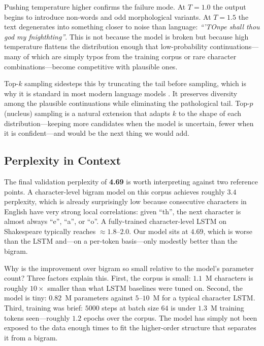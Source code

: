 \noindent Pushing temperature higher confirms the failure mode. At $T = 1.0$ the
output begins to introduce non-words and odd morphological variants. At
$T = 1.5$ the text degenerates into something closer to noise than
language: \emph{``'TOnpe shall thou god my fnighthting''}. This is not
because the model is broken but because high temperature flattens the
distribution enough that low-probability continuations---many of which
are simply typos from the training corpus or rare character
combinations---become competitive with plausible ones.

\noindent Top-$k$ sampling sidesteps this by truncating the tail before sampling,
which is why it is standard in most modern language models
\parencite{holtzman2020curious}. It preserves diversity among the
plausible continuations while eliminating the pathological tail. Top-$p$
(nucleus) sampling is a natural extension that adapts $k$ to the shape of
each distribution---keeping more candidates when the model is uncertain,
fewer when it is confident---and would be the next thing we would add.

\subsection{Perplexity in Context}
\label{sec:perplexity}
The final validation perplexity of \textbf{4.69} is worth interpreting
against two reference points. A character-level bigram model on this
corpus achieves roughly $3.4$ perplexity, which is already surprisingly
low because consecutive characters in English have very strong local
correlations: given ``th'', the next character is almost always ``e'',
``a'', or ``o''. A fully-trained character-level LSTM on Shakespeare
typically reaches $\approx 1.8$--$2.0$. Our model sits at $4.69$,
which is worse than the LSTM and---on a per-token basis---only modestly
better than the bigram.

\noindent Why is the improvement over bigram so small relative to the model's
parameter count? Three factors explain this. First, the corpus is
small: $1.1$~M characters is roughly $10\times$ smaller than what LSTM
baselines were tuned on. Second, the model is tiny: $0.82$~M parameters
against $5$--$10$~M for a typical character LSTM. Third, training was
brief: $5000$ steps at batch size $64$ is under $1.3$~M training tokens
seen---roughly $1.2$ epochs over the corpus. The model has simply not
been exposed to the data enough times to fit the higher-order structure
that separates it from a bigram.

